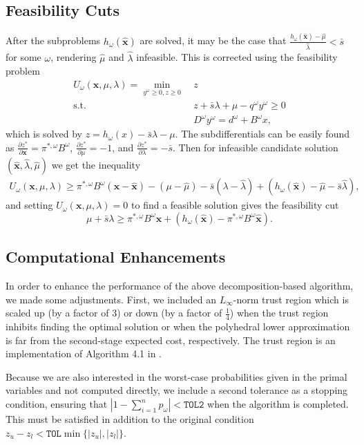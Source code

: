 \documentclass[ijoc,letterpaper]{informs3} %
\newcommand{\x}{\mathbf{x}}
\newcommand{\xh}{\hat{\x}}
\newcommand{\lh}{\hat{\lambda}}
\newcommand{\mh}{\hat{\mu}}
\newcommand{\st}{\mbox{s.t.}}
\begin{document}
\subsection{Feasibility Cuts}
After the subproblems $h_\omega(\xh)$ are solved, it may be the case that $\frac{h_\omega(\xh)-\mh}{\lh} < \bar{s}$ for some $\omega$, rendering $\mh$ and $\lh$ infeasible.
This is corrected using the feasibility problem
\begin{align*}
	U_\omega(\x,\mu,\lambda) = \min_{y^\omega \geq 0, z \geq 0} \ & z \\
	\st \ & z + \bar{s}\lambda + \mu - q^\omega y^\omega \geq 0 \\
	& D^\omega y^\omega = d^\omega + B^\omega x,
\end{align*}
which is solved by $z = h_\omega(x) - \bar{s}\lambda - \mu$.
The subdifferentials can be easily found as $\frac{\partial z^*}{\partial \x} = \pi^{*,\omega} B^\omega$, $\frac{\partial z^*}{\partial \mu} = -1$, and $\frac{\partial z^*}{\partial \lambda} = -\bar{s}$.
Then for infeasible candidate solution $(\xh,\lh,\mh)$ we get the inequality
\begin{align*}
	U_\omega(\x,\mu,\lambda) \geq \pi^{*,\omega}B^\omega(\x-\xh) - (\mu -\mh) - \bar{s}(\lambda - \lh) + (h_\omega(\xh) - \mh - \bar{s}\lh),
\end{align*}
and setting $U_\omega(\x,\mu,\lambda) = 0$ to find a feasible solution gives the feasibility cut
\[
	\mu + \bar{s} \lambda \geq \pi^{*,\omega}B^\omega \x + (h_\omega(\xh) - \pi^{*,\omega}B^\omega\xh).
\]

\subsection{Computational Enhancements}

In order to enhance the performance of the above decomposition-based algorithm, we made some adjustments.
First, we included an $L_\infty$-norm trust region which is scaled up (by a factor of $3$) or down (by a factor of $\tfrac{1}{4}$) when the trust region inhibits finding the optimal solution or when the polyhedral lower approximation is far from the second-stage expected cost, respectively.
The trust region is an implementation of Algorithm 4.1 in \cite{nocedal1999numerical}.

Because we are also interested in the worst-case probabilities given in the primal variables and not computed directly, we include a second tolerance as a stopping condition, ensuring that $\left| 1 - \sum_{i=1}^n p_\omega \right| < \texttt{TOL2}$ when the algorithm is completed.
This must be satisfied in addition to the original condition $z_u - z_l < \texttt{TOL}\min\{|z_u|,|z_l|\}$.
\end{document}

